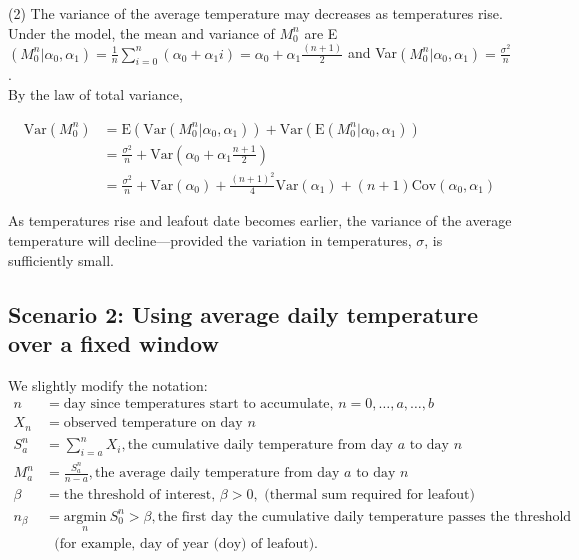 \documentclass[11pt]{article}
\begin{document}
(2) The variance of the average temperature may decreases as temperatures rise.\\

Under the model, the mean and variance of $M_0^n$ are E$(M_0^n | \alpha_0, \alpha_1) = \frac{1}{n} \sum_{i=0}^n ( \alpha_0 + \alpha_1 i )  = \alpha_0 + \alpha_1 \frac{(n + 1)}{2} $ and Var$(M_0^n | \alpha_0, \alpha_1) = \frac{\sigma^2}{n}$.\\

By the law of total variance,

\begin{align*}
\text{Var}(M_0^n)& = \text{E}(\text{Var}(M_0^n | \alpha_0, \alpha_1)) + \text{Var}(\text{E}(M_0^n | \alpha_0, \alpha_1))\\
& = \frac{\sigma^2}{n} + \text{Var}(\alpha_0 + \alpha_1 \frac{n+1}{2})\\
& = \frac{\sigma^2}{n} + \text{Var}(\alpha_0) + \frac{(n+1)^2}{4} \text{Var}(\alpha_1) + (n+1) \text{Cov}(\alpha_0, \alpha_1)
\end{align*}

As temperatures rise and leafout date becomes earlier, the variance of the average temperature will decline---provided the variation in temperatures, $\sigma$, is sufficiently small. 

\subsection{Scenario 2: Using average daily temperature over a fixed window}

We slightly modify the notation:
\begin{align*}
n & = \text{day since temperatures start to accumulate, }  n = 0, \ldots, a, \ldots, b\\
X_n & = \text{observed temperature on day $n$} \\
S_a^n & = \sum_{i = a}^{n}X_i, \text{the cumulative daily temperature from day $a$ to day $n$}\\ 
M_a^n & = \frac{S_a^n}{n-a}, \text{the average daily temperature from day $a$ to day $n$}\\ 
\beta & = \text{the threshold of interest, } \beta > 0, \text{ (thermal sum required for leafout)}\\
n_{\beta} &  = \underset{n}{\text{argmin}} \ S_0^n > \beta, \text{the first day the cumulative daily temperature passes the threshold} \\
& \ \ \ \text{(for example, day of year (doy) of leafout).}
\end{align*} 
\end{document}
